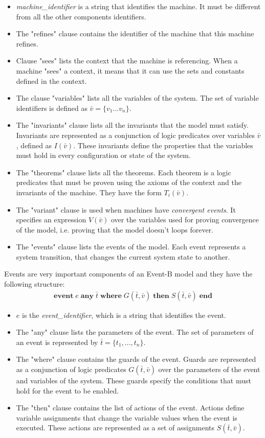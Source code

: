 \begin{itemize}
    \item \textit{machine\_identifier} is a string that identifies the machine. It must be different from all the other components identifiers.
    \item The "refines" clause contains the identifier of the machine that this machine refines.
    \item Clause "sees" lists the context that the machine is referencing. When a machine "sees" a context, it means that it can use the sets and constants defined in the context.
    \item The clause "variables" lists all the variables of the system. The set of variable identifiers is defined as $\bar{v} = \{v_1...v_n\}$.
    \item The "invariants" clause lists all the invariants that the model must satisfy. Invariants are represented as a conjunction of logic predicates over variables $\bar{v}$, defined as $I(\bar{v})$. These invariants define the properties that the variables must hold in every configuration or state of the system.
    \item The "theorems" clause lists all the theorems. Each theorem is a logic predicates that must be proven using the axioms of the context and the invariants of the machine. They have the form $T_i(\bar{v})$.
    \item The "variant" clause is used when machines have \textit{convergent events}. It specifies an expression $V(\bar{v})$ over the variables used for proving convergence of the model, i.e. proving that the model doesn't loops forever.
    \item The "events" clause lists the events of the model. Each event represents a system transition, that changes the current system state to another.
\end{itemize}
Events are very important components of an Event-B model and they have the following structure:
\begin{align*}
    \textbf{event} \; e \; \textbf{any} \; \bar{t} \; \textbf{where} \; G(\bar{t}, \bar{v}) \; \textbf{then} \; S(\bar{t}, \bar{v}) \; \textbf{end} 
\end{align*}
\begin{itemize}
    \item $e$ is the \textit{event\_identifier}, which is a string that identifies the event.
    \item The "any" clause lists the parameters of the event. The set of parameters of an event is represented by $\bar{t} = \{t_1,...,t_n\}$.
    \item The "where" clause contains the guards of the event. Guards are represented as a conjunction of logic predicates $G(\bar{t}, \bar{v})$ over the parameters of the event and variables of the system. These guards specify the conditions that must hold for the event to be enabled.
    \item The "then" clause contains the list of actions of the event. Actions define variable assignments that change the variable values when the event is executed. These actions are represented as a set of assignments $S(\bar{t}, \bar{v})$.
\end{itemize} 
